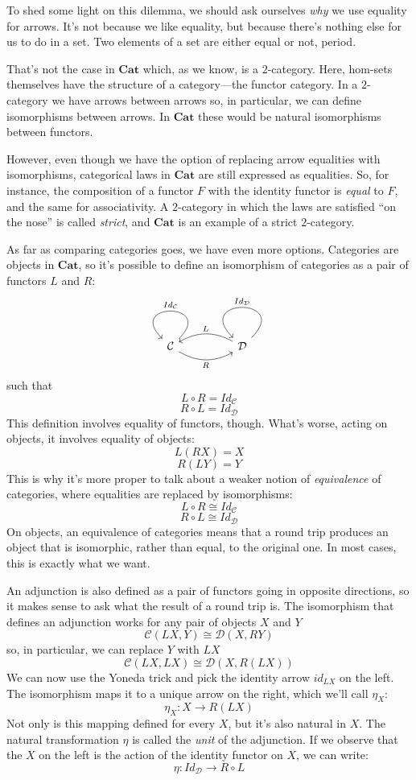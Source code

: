 \documentclass[DaoFP]{subfiles}
\begin{document}
To shed some light on this dilemma, we should ask ourselves \emph{why} we use equality for arrows. It's not because we like equality, but because there's nothing else for us to do in a set. Two elements of a set are either equal or not, period. 

That's not the case in  $\mathbf{Cat}$ which, as we know, is a $2$-category. Here, hom-sets themselves have the structure of a category---the functor category. In a $2$-category we have arrows between arrows so, in particular, we can define isomorphisms between arrows. In $\mathbf{Cat}$ these would be natural isomorphisms between functors.

However, even though we have the option of replacing arrow equalities with isomorphisms, categorical laws in $\mathbf{Cat}$ are still expressed as equalities. So, for instance, the composition of a functor $F$ with the identity functor is \emph{equal} to $F$, and the same for associativity. A $2$-category in which the laws are satisfied ``on the nose'' is called \emph{strict}, and $\mathbf{Cat}$ is an example of a strict $2$-category. 

As far as comparing categories goes, we have even more options. Categories are objects in $\mathbf{Cat}$, so it's possible to define an isomorphism of categories as a pair of functors $L$ and $R$:
\[
 \begin{tikzcd}
  \mathcal{C}
  \arrow[rr, bend right, "R"']
  \arrow[loop, "Id_{ \mathcal{C}} "']
  &&
  \mathcal{D}
  \arrow[ll, bend right, "L"']
  \arrow[loop, "Id_{ \mathcal{D}} "']
  \end{tikzcd}
\]
such that
\[ L \circ R = Id_{ \mathcal{C}} \]
\[ R \circ L = Id_{ \mathcal{D}} \]
This definition involves equality of functors, though. What's worse, acting on objects, it involves equality of objects:
\[ L (R X) = X \]
\[ R (L Y) = Y \]
This is why it's more proper to talk about a weaker notion of \emph{equivalence} of categories, where equalities are replaced by isomorphisms:
\[ L \circ R \cong Id_{ \mathcal{C}} \]
\[ R \circ L \cong Id_{ \mathcal{D}} \]
On objects, an equivalence of categories means that a round trip produces an object that is isomorphic, rather than equal, to the original one. In most cases, this is exactly what we want.

An adjunction is also defined as a pair of functors going in opposite directions, so it makes sense to ask what the result of a round trip is. The isomorphism that defines an adjunction works for any pair of objects $X$ and $Y$
\[  \mathcal{C} (L X, Y) \cong \mathcal{D}( X , R Y)\]
so, in particular, we can replace $Y$ with $L X$
\[  \mathcal{C} (L X, L X) \cong \mathcal{D}( X , R (L X))\]
We can now use the Yoneda trick and pick the identity arrow $id_{L X}$ on the left. The isomorphism maps it to a unique arrow on the right, which we'll call $\eta_X$:
\[ \eta_X \colon X \to R ( L X) \]
Not only is this mapping defined for every $X$, but it's also natural in $X$. The natural transformation $\eta$ is called the \emph{unit} of the adjunction. If we observe that the $X$ on the left is the action of the identity functor on $X$, we can write:
\[ \eta \colon Id_{\mathcal{D}} \to R \circ L \]
\end{document}
